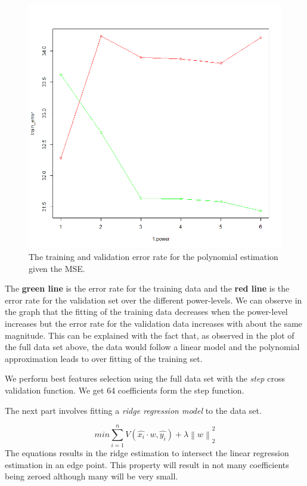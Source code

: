 \documentclass[a4paper,12pt]{article}
\begin{document}
\begin{figure}[H]
\centering
\begin{minipage}[]{0.75\textwidth}
  \includegraphics[width=\textwidth]{figures/Lab2A2_test_train_err.png}  
  \caption{The training and validation error rate for the polynomial estimation given the MSE.}
 \end{minipage}
\end{figure}

The \textbf{green line} is the error rate for the training data and the \textbf{red line} is the error rate for the validation set over the different power-levels. We can observe in the graph that the fitting of the training data decreases when the power-level increases but the error rate for the validation data increases with about the same magnitude. This can be explained with the fact that, as observed in the plot of the full data set above, the data would follow a linear model and the polynomial approximation leads to over fitting of the training set.  

We perform best features selection using the full data set with the \textit{step}  cross validation function. We get 64 coefficients form the step function.

The next part involves fitting a \textit{ridge regression model} to the data set.

\begin{equation}
  min \sum_{i = 1}^n{V(\hat{x_i}\cdot w,\hat{y_i}) + \lambda\left \| w \right \|}^2_2
\end{equation}
The equations results in the ridge estimation to intersect the linear regression estimation in an edge point. This property will result in not many coefficients being zeroed although many will be very small.
\end{document}
